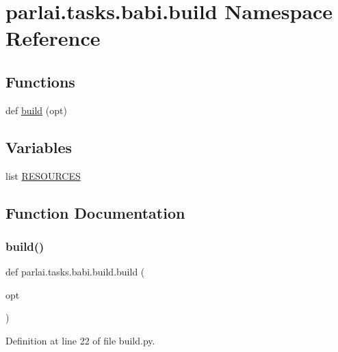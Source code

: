 \hypertarget{namespaceparlai_1_1tasks_1_1babi_1_1build}{}\section{parlai.\+tasks.\+babi.\+build Namespace Reference}
\label{namespaceparlai_1_1tasks_1_1babi_1_1build}
\subsection*{Functions}
\begin{DoxyCompactItemize}
\item 
def \hyperlink{namespaceparlai_1_1tasks_1_1babi_1_1build_a24b76b74415839eb5c7fa1233fbface4}{build} (opt)
\end{DoxyCompactItemize}
\subsection*{Variables}
\begin{DoxyCompactItemize}
\item 
list \hyperlink{namespaceparlai_1_1tasks_1_1babi_1_1build_ad43c8fefdd636b159033010bba7395f1}{R\+E\+S\+O\+U\+R\+C\+ES}
\end{DoxyCompactItemize}


\subsection{Function Documentation}
\mbox{\label{namespaceparlai_1_1tasks_1_1babi_1_1build_a24b76b74415839eb5c7fa1233fbface4}} 
\subsubsection{\texorpdfstring{build()}{build()}}
{\footnotesize\ttfamily def parlai.\+tasks.\+babi.\+build.\+build (\begin{DoxyParamCaption}\item[{}]{opt }\end{DoxyParamCaption})}



Definition at line 22 of file build.\+py.


